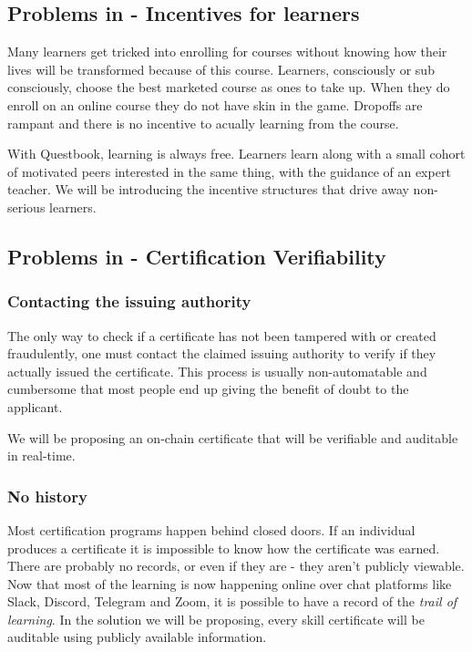 \documentclass{article}
\begin{document}
       
    \subsection{Problems in - Incentives for learners}
      Many learners get tricked into enrolling for courses without knowing how their lives will be transformed because of this course.
      Learners, consciously or sub consciously, choose the best marketed course as ones to take up. 
      When they do enroll on an online course they do not have skin in the game. 
      Dropoffs are rampant and there is no incentive to acually learning from the course.
      \par
      With Questbook, learning is always free. 
      Learners learn along with a small cohort of motivated peers interested in the same thing, with the guidance of an expert teacher.
      We will be introducing the incentive structures that drive away non-serious learners.
    \subsection{Problems in - Certification Verifiability}
      \subsubsection{Contacting the issuing authority}
        The only way to check if a certificate has not been tampered with or created fraudulently, one must contact the claimed issuing authority to verify if they actually issued the certificate. 
        This process is usually non-automatable and cumbersome that most people end up giving the benefit of doubt to the applicant. 
        \par
        We will be proposing an on-chain certificate that will be verifiable and auditable in real-time.
      \subsubsection{No history}
        Most certification programs happen behind closed doors. If an individual produces a certificate it is impossible to know how the certificate was earned. There are probably no records, or even if they are - they aren't publicly viewable. 
        \break
        Now that most of the learning is now happening online over chat platforms like Slack, Discord, Telegram and Zoom, it is possible to have a record of the \textit{trail of learning}. In the solution we will be proposing, every skill certificate will be auditable using publicly available information.
\end{document}
